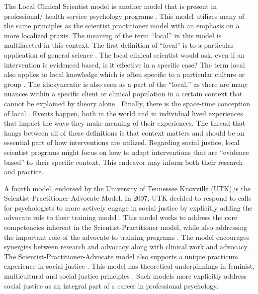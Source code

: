 \documentclass[
  11pt,
]{book}
\begin{document}
The Local Clinical Scientist model is another model that is present in professional/ health service psychology programs \citep{trierweiler_research_2010}. This model utilizes many of the same principles as the scientist practitioner model with an emphasis on a more localized praxis. The meaning of the term ``local'' in this model is multifaceted in this context. The first definition of ``local'' is to a particular application of general science \citep{stricker_local_2006}. The local clinical scientist would ask, even if an intervention is evidenced based, is it effective in a specific case? The term local also applies to local knowledge which is often specific to a particular culture or group \citep{stricker_local_2006}. The idiosyncratic is also seen as a part of the ``local,'' as there are many nuances within a specific client or clinical population in a certain context that cannot be explained by theory alone \citep{stricker_local_2006}. Finally, there is the space-time conception of local \citep{stricker_local_2006}. Events happen, both in the world and in individual lived experiences that impact the ways they make meaning of their experiences. The thread that hangs between all of these definitions is that context matters and should be an essential part of how interventions are utilized. Regarding social justice, local scientist programs might focus on how to adapt interventions that are ``evidence based'' to their specific context. This endeavor may inform both their research and practice.

A fourth model, endorsed by the University of Tennessee Knoxville (UTK),is the Scientist-Practitioner-Advocate Model. In 2007, UTK decided to respond to calls for psychologists to more actively engage in social justice by explicitly adding the advocate role to their training model \citep{noauthor_scientist-practitioner_nodate}. This model works to address the core competencies inherent in the Scientist-Practitioner model, while also addressing the important role of the advocate to training programs \citep{mallinckrodt_scientist-practitioner-advocate_2014}. The model encourages synergies between research and advocacy along with clinical work and advocacy \citep{mallinckrodt_scientist-practitioner-advocate_2014}. The Scientist-Practitioner-Advocate model also supports a unique practicum experience in social justice \citep{mallinckrodt_scientist-practitioner-advocate_2014}. This model has theoretical underpinnings in feminist, multicultural and social justice principles \citep{noauthor_scientist-practitioner_nodate}. Such models more explicitly address social justice as an integral part of a career in professional psychology.
\end{document}
